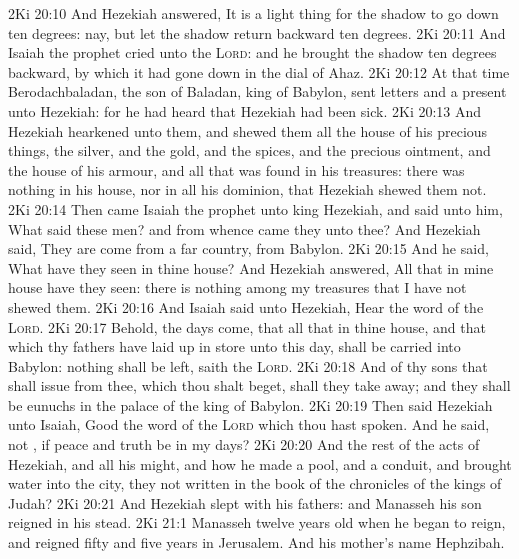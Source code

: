 \vs 2Ki 20:10 And Hezekiah answered, It is a light thing for the shadow to go down ten degrees: nay, but let the shadow return backward ten degrees.
\vs 2Ki 20:11 And Isaiah the prophet cried unto the \textsc{Lord}: and he brought the shadow ten degrees backward, by which it had gone down in the dial of Ahaz.
\vs 2Ki 20:12 At that time Berodachbaladan, the son of Baladan, king of Babylon, sent letters and a present unto Hezekiah: for he had heard that Hezekiah had been sick.
\vs 2Ki 20:13 And Hezekiah hearkened unto them, and shewed them all the house of his precious things, the silver, and the gold, and the spices, and the precious ointment, and  the house of his armour, and all that was found in his treasures: there was nothing in his house, nor in all his dominion, that Hezekiah shewed them not.
\vs 2Ki 20:14 Then came Isaiah the prophet unto king Hezekiah, and said unto him, What said these men? and from whence came they unto thee? And Hezekiah said, They are come from a far country,  from Babylon.
\vs 2Ki 20:15 And he said, What have they seen in thine house? And Hezekiah answered, All  that  in mine house have they seen: there is nothing among my treasures that I have not shewed them.
\vs 2Ki 20:16 And Isaiah said unto Hezekiah, Hear the word of the \textsc{Lord}.
\vs 2Ki 20:17 Behold, the days come, that all that  in thine house, and that which thy fathers have laid up in store unto this day, shall be carried into Babylon: nothing shall be left, saith the \textsc{Lord}.
\vs 2Ki 20:18 And of thy sons that shall issue from thee, which thou shalt beget, shall they take away; and they shall be eunuchs in the palace of the king of Babylon.
\vs 2Ki 20:19 Then said Hezekiah unto Isaiah, Good  the word of the \textsc{Lord} which thou hast spoken. And he said,  not , if peace and truth be in my days?
\vs 2Ki 20:20 And the rest of the acts of Hezekiah, and all his might, and how he made a pool, and a conduit, and brought water into the city,  they not written in the book of the chronicles of the kings of Judah?
\vs 2Ki 20:21 And Hezekiah slept with his fathers: and Manasseh his son reigned in his stead.
\vs 2Ki 21:1 Manasseh  twelve years old when he began to reign, and reigned fifty and five years in Jerusalem. And his mother's name  Hephzibah.
